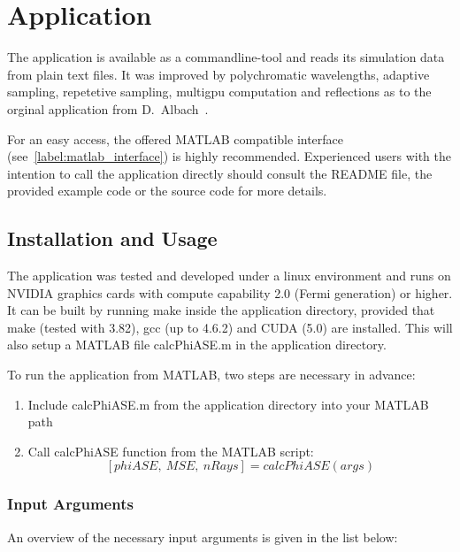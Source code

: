 \section{Application}
\label{sec:application}

The application is available as a commandline-tool and reads
its simulation data from plain text files. It was improved by polychromatic
wavelengths, adaptive sampling, repetetive sampling, multigpu computation and 
reflections as to the orginal application from D.~Albach~\cite{ASE2010}.

For an easy access, the offered MATLAB compatible interface (see~\ref{label:matlab_interface}) 
is highly recommended. Experienced users with the intention to call the application
directly should consult the README file, the provided 
example code or the source code for more details.

\subsection{Installation and Usage}
The application was tested and developed under a linux environment
and runs on NVIDIA graphics cards with compute capability 2.0 (Fermi generation) or higher.
It can be built by running make inside the application directory, provided
that make (tested with 3.82), gcc (up to 4.6.2) and CUDA (5.0) are installed. 
This will also setup a MATLAB file calcPhiASE.m in the application
directory. 

To run the application from MATLAB, two steps are
necessary in advance:
\begin{enumerate}
\label{label:matlab_interface}
  \item Include calcPhiASE.m from the application directory into your MATLAB path
  \item Call calcPhiASE function from the MATLAB script: \[[phiASE,~MSE,~nRays] = calcPhiASE(args)\]
\end{enumerate}

\subsubsection{Input Arguments}
An overview of the necessary input arguments is given 
in the list below:

